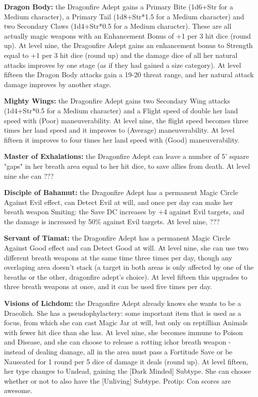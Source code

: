 \begin{itemize*}
\item \textbf{Dragon Body:} the Dragonfire Adept gains a Primary Bite (1d6+Str for a Medium character), a Primary Tail (1d8+Str*1.5 for a Medium character) and two Secondary Claws (1d4+Str*0.5 for a Medium character). These are all actually magic weapons with an Enhancement Bonus of +1 per 3 hit dice (round up). At level nine, the Dragonfire Adept gains an enhancement bonus to Strength equal to +1 per 3 hit dice (round up) and the damage dice of all her natural attacks improves by one stage (as if they had gained a size category). At level fifteen the Dragon Body attacks gain a 19-20 threat range, and her natural attack damage improves by another stage.
\item \textbf{Mighty Wings:} the Dragonfire Adept gains two Secondary Wing attacks (1d4+Str*0.5 for a Medium character) and a Flight speed of double her land speed with (Poor) maneuverability. At level nine, the flight speed becomes three times her land speed and it improves to (Average) maneuverability. At level fifteen it improves to four times her land speed with (Good) maneuverability.
\item \textbf{Master of Exhalations:} the Dragonfire Adept can leave a number of 5' square "gaps" in her breath area equal to her hit dice, to save allies from death. At level nine she can ??? 
\item \textbf{Disciple of Bahamut:} the Dragonfire Adept has a permanent Magic Circle Against Evil effect, can Detect Evil at will, and once per day can make her breath weapon Smiting: the Save DC increases by +4 against Evil targets, and the damage is increased by 50\% against Evil targets. At level nine, ??? 
\item \textbf{Servant of Tiamat:} the Dragonfire Adept has a permanent Magic Circle Against Good effect and can Detect Good at will. At level nine, she can use two different breath weapons at the same time three times per day, though any overlaping area doesn't stack (a target in both areas is only affected by one of the breaths or the other, dragonfire adept's choice). At level fifteen this upgrades to three breath weapons at once, and it can be used five times per day. 
\item \textbf{Visions of Lichdom:} the Dragonfire Adept already knows she wants to be a Dracolich. She has a pseudophylactery: some important item that is used as a focus, from which she can cast Magic Jar at will, but only on reptillian Animals with fewer hit dice than she has. At level nine, she becomes immune to Poison and Disease, and she can choose to release a rotting ichor breath weapon - instead of dealing damage, all in the area must pass a Fortitude Save or be Nauseated for 1 round per 5 dice of damage it deals (round up). At level fifteen, her type changes to Undead, gaining the [Dark Minded] Subtype. She can choose whether or not to also have the [Unliving] Subtype. Protip: Con scores are awesome.
\end{itemize*}

